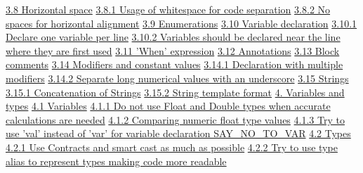 \hspace{0.5cm}\hyperref[sec:3.8]{ 3.8 Horizontal space}
\hspace{1.0cm}\hyperref[sec:3.8.1]{ 3.8.1 Usage of whitespace for code separation}
\hspace{1.0cm}\hyperref[sec:3.8.2]{ 3.8.2 No spaces for horizontal alignment}
\hspace{0.5cm}\hyperref[sec:3.9]{ 3.9 Enumerations}
\hspace{0.5cm}\hyperref[sec:3.10]{ 3.10 Variable declaration}
\hspace{1.0cm}\hyperref[sec:3.10.1]{ 3.10.1 Declare one variable per line}
\hspace{1.0cm}\hyperref[sec:3.10.2]{ 3.10.2 Variables should be declared near the line where they are first used}
\hspace{0.5cm}\hyperref[sec:3.11]{ 3.11 'When' expression}
\hspace{0.5cm}\hyperref[sec:3.12]{ 3.12 Annotations}
\hspace{0.5cm}\hyperref[sec:3.13]{ 3.13 Block comments}
\hspace{0.5cm}\hyperref[sec:3.14]{ 3.14 Modifiers and constant values}
\hspace{1.0cm}\hyperref[sec:3.14.1]{ 3.14.1 Declaration with multiple modifiers}
\hspace{1.0cm}\hyperref[sec:3.14.2]{ 3.14.2 Separate long numerical values with an underscore}
\hspace{1.0cm}\hyperref[sec:3.15]{ 3.15 Strings}
\hspace{1.0cm}\hyperref[sec:3.15.1]{ 3.15.1 Concatenation of Strings}
\hspace{1.0cm}\hyperref[sec:3.15.2]{ 3.15.2 String template format}
\hspace{0.0cm}\hyperref[sec:4.]{4. Variables and types}
\hspace{0.5cm}\hyperref[sec:4.1]{ 4.1 Variables}
\hspace{1.0cm}\hyperref[sec:4.1.1]{ 4.1.1 Do not use Float and Double types when accurate calculations are needed}
\hspace{1.0cm}\hyperref[sec:4.1.2]{ 4.1.2 Comparing numeric float type values}
\hspace{1.0cm}\hyperref[sec:4.1.3]{ 4.1.3 Try to use 'val' instead of 'var' for variable declaration SAY_NO_TO_VAR}
\hspace{0.5cm}\hyperref[sec:4.2]{ 4.2 Types}
\hspace{1.0cm}\hyperref[sec:4.2.1]{ 4.2.1 Use Contracts and smart cast as much as possible}
\hspace{1.0cm}\hyperref[sec:4.2.2]{ 4.2.2 Try to use type alias to represent types making code more readable}
